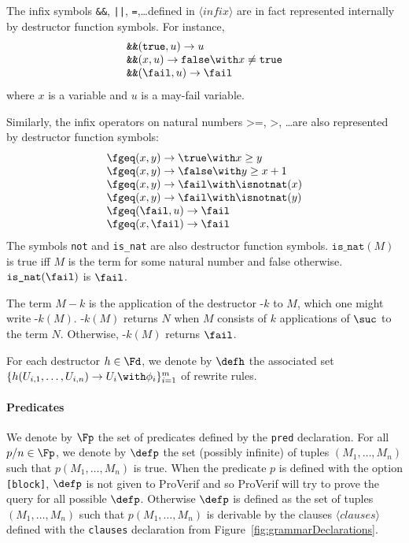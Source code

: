 \documentclass{book}
\newcommand{\nonterm}[1]{\langle\mathit{#1}\rangle}
\begin{document}
The infix symbols \texttt{\&\&}, \texttt{||}, \texttt{=},\ldots defined in $\nonterm{infix}$ are in fact represented internally by destructor function symbols. For instance,
\[
\begin{array}{l}
\texttt{\&\&}(\texttt{true},u) \rightarrow u\\
\texttt{\&\&}(x,u) \rightarrow \texttt{false} \with x \neq \texttt{true}\\
\texttt{\&\&}(\fail,u) \rightarrow \fail
\end{array}
\]
where $x$ is a variable and $u$ is a may-fail variable.

Similarly, the infix operators on natural numbers $\texttt{>=}$, $\texttt{>}$, \ldots are also represented by destructor function symbols:
\[
\begin{array}{l}
\fgeq(x,y) \rightarrow \true \with x \geq y\\
\fgeq(x,y) \rightarrow \false \with y \geq x+1\\
\fgeq(x,y) \rightarrow \fail \with \isnotnat(x)\\
\fgeq(x,y) \rightarrow \fail \with \isnotnat(y)\\
\fgeq(\fail,u) \rightarrow \fail\\
\fgeq(x,\fail) \rightarrow \fail\\
\end{array}
\]
The symbols \texttt{not} and \texttt{is\_nat} are also destructor function
symbols.
$\texttt{is\_nat}(M)$ is true iff $M$ is the term for some natural number
and false otherwise. $\texttt{is\_nat}(\fail)$ is $\fail$.

The term $M - k$ is the application of the destructor $\texttt{-}k$ to $M$, which one might write $\texttt{-}k(M)$. $\texttt{-}k(M)$ returns $N$ when $M$ consists of $k$ applications of $\suc$ to the term $N$. Otherwise, $\texttt{-}k(M)$ returns $\fail$.


For each destructor $h \in \Fd$, we denote by $\defh$ the associated set $\{ h(U_{i,1},\ldots,U_{i,n}) \rightarrow U_i \with \phi_i\}_{i=1}^m$ of rewrite rules.

\paragraph{Predicates}

We denote by $\Fp$ the set of predicates defined by the \texttt{pred} declaration. For all $p/n \in \Fp$, we denote by $\defp$ the set (possibly infinite) of tuples $(M_1,\ldots, M_n)$ such that $p(M_1,\ldots,M_n)$ is true. When the predicate $p$ is defined with the option \texttt{[block]}, $\defp$ is not given to ProVerif and so ProVerif will try to prove the query for all possible $\defp$. Otherwise $\defp$ is defined as the set of tuples $(M_1,\ldots,M_n)$ such that $p(M_1,\ldots,M_n)$ is derivable by the clauses $\nonterm{clauses}$ defined with the \texttt{clauses} declaration from Figure~\ref{fig:grammarDeclarations}.
\end{document}

